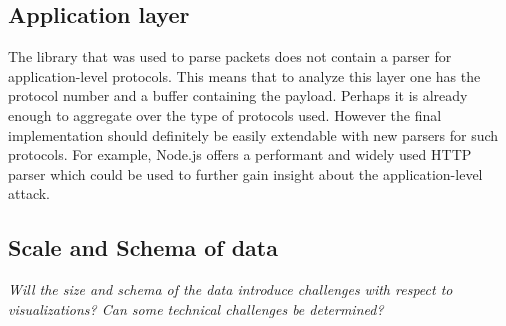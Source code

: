 \subsection{Application layer}
The library that was used to parse packets does not contain a parser for application-level protocols. This means that to analyze this layer one has the protocol number and a buffer containing the payload. Perhaps it is already enough to aggregate over the type of protocols used. However the final implementation should definitely be easily extendable with new parsers for such protocols. For example, Node.js offers a performant and widely used HTTP parser which could be used to further gain insight about the application-level attack.
     
\subsection{Scale and Schema of data}\label{scaleandschema}
\textit{Will the size and schema of the data introduce challenges with respect to visualizations? Can some technical challenges be determined?
}


